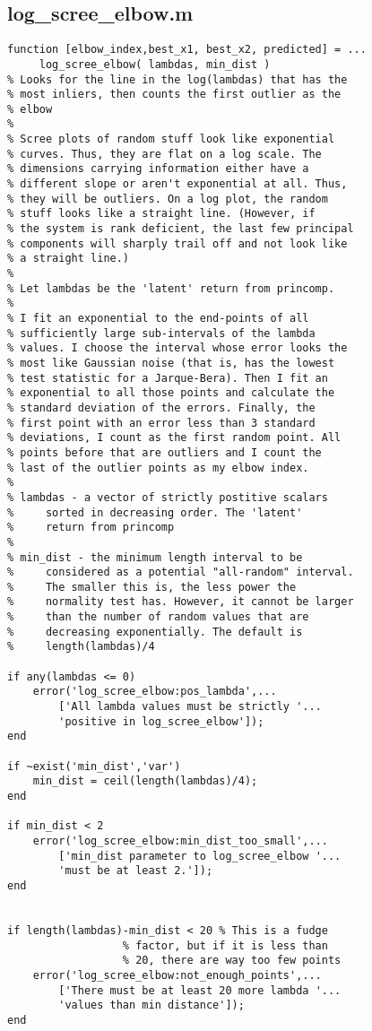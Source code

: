 \documentclass[eric_thesis.tex]{subfiles}
\begin{document}
\subsection{log\_scree\_elbow.m}
\begin{lstlisting}
function [elbow_index,best_x1, best_x2, predicted] = ...
     log_scree_elbow( lambdas, min_dist )
% Looks for the line in the log(lambdas) that has the
% most inliers, then counts the first outlier as the
% elbow
%
% Scree plots of random stuff look like exponential
% curves. Thus, they are flat on a log scale. The
% dimensions carrying information either have a
% different slope or aren't exponential at all. Thus,
% they will be outliers. On a log plot, the random
% stuff looks like a straight line. (However, if
% the system is rank deficient, the last few principal
% components will sharply trail off and not look like
% a straight line.)
% 
% Let lambdas be the 'latent' return from princomp.
% 
% I fit an exponential to the end-points of all
% sufficiently large sub-intervals of the lambda
% values. I choose the interval whose error looks the
% most like Gaussian noise (that is, has the lowest
% test statistic for a Jarque-Bera). Then I fit an
% exponential to all those points and calculate the
% standard deviation of the errors. Finally, the
% first point with an error less than 3 standard
% deviations, I count as the first random point. All
% points before that are outliers and I count the
% last of the outlier points as my elbow index.
%
% lambdas - a vector of strictly postitive scalars
%     sorted in decreasing order. The 'latent'
%     return from princomp
%
% min_dist - the minimum length interval to be
%     considered as a potential "all-random" interval.
%     The smaller this is, the less power the
%     normality test has. However, it cannot be larger
%     than the number of random values that are
%     decreasing exponentially. The default is
%     length(lambdas)/4

if any(lambdas <= 0)
    error('log_scree_elbow:pos_lambda',...
        ['All lambda values must be strictly '...
        'positive in log_scree_elbow']);
end

if ~exist('min_dist','var')
    min_dist = ceil(length(lambdas)/4);
end

if min_dist < 2
    error('log_scree_elbow:min_dist_too_small',...
        ['min_dist parameter to log_scree_elbow '...
        'must be at least 2.']);
end
        

if length(lambdas)-min_dist < 20 % This is a fudge
                  % factor, but if it is less than 
                  % 20, there are way too few points
    error('log_scree_elbow:not_enough_points',...
        ['There must be at least 20 more lambda '...
        'values than min distance']);
end


\end{lstlisting}
\end{document}

